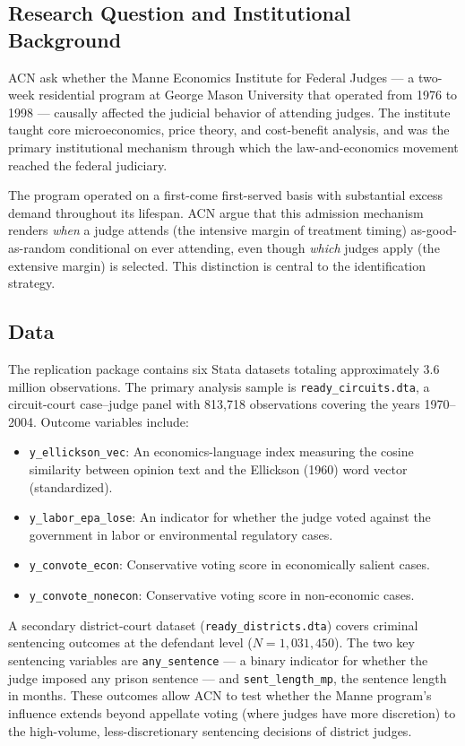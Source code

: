 \documentclass[12pt,a4paper]{article}
\begin{document}
\subsection{Research Question and Institutional Background}

ACN ask whether the Manne Economics Institute for Federal Judges --- a two-week residential program at George Mason University that operated from 1976 to 1998 --- causally affected the judicial behavior of attending judges. The institute taught core microeconomics, price theory, and cost-benefit analysis, and was the primary institutional mechanism through which the law-and-economics movement reached the federal judiciary.

The program operated on a first-come first-served basis with substantial excess demand throughout its lifespan. ACN argue that this admission mechanism renders \emph{when} a judge attends (the intensive margin of treatment timing) as-good-as-random conditional on ever attending, even though \emph{which} judges apply (the extensive margin) is selected. This distinction is central to the identification strategy.

\subsection{Data}

The replication package contains six Stata datasets totaling approximately 3.6 million observations. The primary analysis sample is \texttt{ready\_circuits.dta}, a circuit-court case--judge panel with 813,718 observations covering the years 1970--2004. Outcome variables include:

\begin{itemize}[nosep]
    \item \texttt{y\_ellickson\_vec}: An economics-language index measuring the cosine similarity between opinion text and the Ellickson (1960) word vector (standardized).
    \item \texttt{y\_labor\_epa\_lose}: An indicator for whether the judge voted against the government in labor or environmental regulatory cases.
    \item \texttt{y\_convote\_econ}: Conservative voting score in economically salient cases.
    \item \texttt{y\_convote\_nonecon}: Conservative voting score in non-economic cases.
\end{itemize}

A secondary district-court dataset (\texttt{ready\_districts.dta}) covers criminal sentencing outcomes at the defendant level ($N = 1,\!031,\!450$). The two key sentencing variables are \texttt{any\_sentence} --- a binary indicator for whether the judge imposed any prison sentence --- and \texttt{sent\_length\_mp}, the sentence length in months. These outcomes allow ACN to test whether the Manne program's influence extends beyond appellate voting (where judges have more discretion) to the high-volume, less-discretionary sentencing decisions of district judges.
\end{document}
